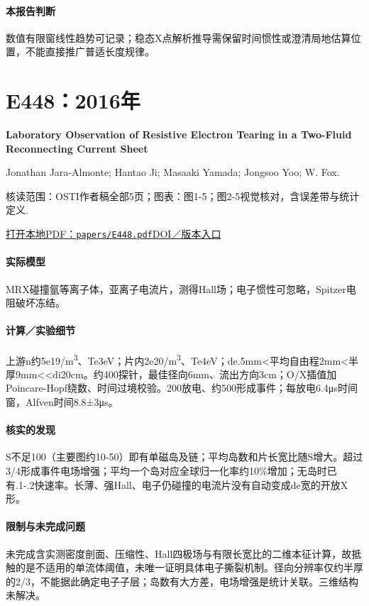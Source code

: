 \paragraph{本报告判断}数值有限窗线性趋势可记录；稳态X点解析推导需保留时间惯性或澄清局地估算位置，不能直接推广普适长度规律。

\section{E448：2016年}\label{paper:E448}

\textbf{Laboratory Observation of Resistive Electron Tearing in a Two-Fluid Reconnecting Current Sheet}\citep{E448}\

Jonathan Jara-Almonte;  Hantao Ji;  Masaaki Yamada;  Jongsoo Yoo;  W. Fox.

\textsf{核读范围：}OSTI作者稿全部5页；\textsf{图表：}图1-5；图2-5视觉核对，含误差带与统计定义.

\href{run:papers/E448.pdf}{打开本地PDF：\texttt{papers/E448.pdf}}\quad\href{https://doi.org/10.1103/physrevlett.117.095001}{DOI／版本入口}

\paragraph{实际模型}MRX碰撞氩等离子体，亚离子电流片，测得Hall场；电子惯性可忽略，Spitzer电阻破坏冻结。

\paragraph{计算／实验细节}上游n约5e19/m\textsuperscript{3}、Te3eV；片内2e20/m\textsuperscript{3}、Te4eV；de.5mm<平均自由程2mm<半厚9mm<<di20cm。约400探针，最佳径向6mm、流出方向3cm；O/X插值加Poincare-Hopf绕数、时间过境校验。200放电、约500形成事件；每放电6.4μs时间窗，Alfven时间8.8±3μs。

\paragraph{核实的发现}S不足100（主要图约10-50）即有单磁岛及链；平均岛数和片长宽比随S增大。超过3/4形成事件电场增强；平均一个岛对应全球归一化率约10\%增加；无岛时已有.1-.2快速率。长薄、强Hall、电子仍碰撞的电流片没有自动变成de宽的开放X形。

\paragraph{限制与未完成问题}未完成含实测密度剖面、压缩性、Hall四极场与有限长宽比的二维本征计算，故抵触的是不适用的单流体阈值，未唯一证明具体电子撕裂机制。径向分辨率仅约半厚的2/3，不能据此确定电子子层；岛数有大方差，电场增强是统计关联。三维结构未解决。

